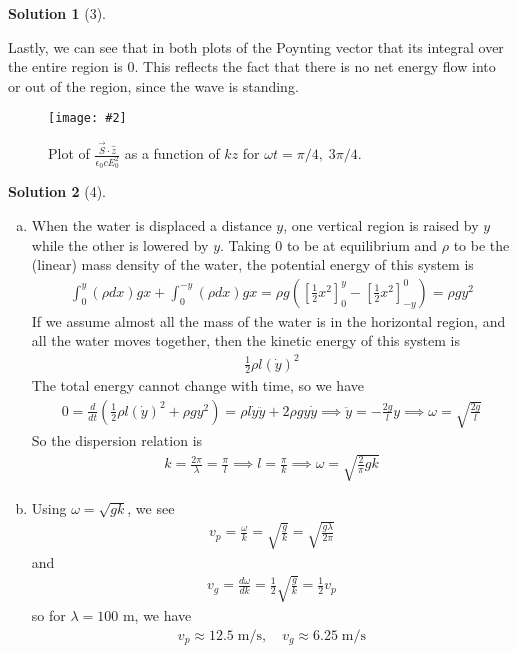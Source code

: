 \documentclass[11pt]{article}
\theoremstyle{definition}
\newtheorem*{solution}{Solution}
\newcommand{\eq}{\begin{equation}\begin{aligned}}
\newcommand{\qe}{\end{aligned}\end{equation}}
\newcommand{\img}[4][0.9\textwidth]{
  \begin{figure}[h]
    \centering
    \texttt{[image: \#2]}
    \caption{#3}
    \label{#4}
  \end{figure}
}
\begin{document}
\begin{solution}[3]
\begin{enumerate}[(a)]
    Lastly, we can see that in both plots of the Poynting vector that its integral over the entire region is 0. This reflects the fact that there is no net energy flow into or out of the region, since the wave is standing.
    \img{3b}{Plot of $\frac{\vec{S}\cdot\hat{z}}{\epsilon_0cE_0^2}$ as a function of $kz$ for $\omega t=\pi/4,\;3\pi/4$.}{fig:point}
  \end{enumerate}
\end{solution}

\begin{solution}[4]
  \begin{enumerate}[(a)]
    \item When the water is displaced a distance $y$, one vertical region is raised by $y$ while the other is lowered by $y$. Taking 0 to be at equilibrium and $\rho$ to be the (linear) mass density of the water, the potential energy of this system is 
    \eq
      \int_0^{y}(\rho dx)gx+\int_0^{-y}(\rho dx)gx=\rho g\left(\left[\frac{1}{2}x^2\right]_0^y-\left[\frac{1}{2}x^2\right]_{-y}^0\right)=\rho gy^2
    \qe
    If we assume almost all the mass of the water is in the horizontal region, and all the water moves together, then the kinetic energy of this system is
    \eq
      \frac{1}{2}\rho l(\dot{y})^2
    \qe
    The total energy cannot change with time, so we have
    \eq
      0=\frac{d}{dt}\left(\frac{1}{2}\rho l(\dot{y})^2+\rho gy^2\right)=\rho l\dot{y}\ddot{y}+2\rho gy\dot{y}\implies \ddot{y}=-\frac{2g}{l}y\implies \boxed{\omega=\sqrt{\frac{2g}{l}}}
    \qe
    So the dispersion relation is
    \eq
      k=\frac{2\pi}{\lambda}=\frac{\pi}{l}\implies l=\frac{\pi}{k}\implies \boxed{\omega=\sqrt{\frac{2}{\pi}gk}}
    \qe
    \item Using $\omega=\sqrt{gk}$, we see
    \eq
      v_p=\frac{\omega}{k}=\sqrt{\frac{g}{k}}=\sqrt{\frac{g\lambda}{2\pi}}
    \qe
    and 
    \eq
      v_g=\frac{d\omega}{dk}=\frac{1}{2}\sqrt{\frac{g}{k}}=\frac{1}{2}v_p
    \qe
    so for $\lambda=100$ m, we have
    \eq
      \boxed{v_p\approx 12.5\;\text{m/s},\quad v_g\approx 6.25\;\text{m/s}}
    \qe
  \end{enumerate}
\end{solution}
\end{document}
